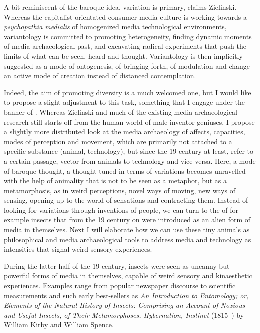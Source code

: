 {A bit reminiscent of the baroque idea, variation is primary, claims
Zielinski. Whereas the capitalist orientated consumer media culture is
working towards a {\em psychopathia medialis} of homogenized media
technological environments, variantology is committed to promoting
heterogeneity, finding dynamic moments of media archaeological past,
and excavating radical experiments that push the limits of what can be
seen, heard and thought. Variantology is then implicitly suggested as a
mode of ontogenesis, of bringing forth, of modulation and change {--}
an active mode of creation instead of distanced contemplation.

Indeed, the aim of promoting diversity is a much welcomed one, but I
would like to propose a slight adjustment to this task, something that
I engage under the banner of . Whereas Zielinski and much
of the existing media archaeological research still starts off from the
human world of male inventor{}-geniuses, I propose a slightly more
distributed look at the media archaeology of affects, capacities, modes
of perception and movement, which are primarily not attached to a
specific substance (animal, technology), but since the 19 century at
least, refer to a certain passage, vector from animals to technology
and vice versa. Here, a mode of baroque thought, a thought tuned in
terms of variations becomes unravelled with the help of animality that
is not to be seen as a metaphor, but as a metamorphosis, as 
in weird perceptions, novel ways of moving, new ways of sensing,
opening up to the world of sensations and contracting them. Instead of
looking for variations through inventions of people, we can turn to the
 of for example insects that from the
19 century on were introduced as an alien form of
media in themselves. Next I will elaborate how we can use these tiny
animals as philosophical and media archaeological tools to address
media and technology as intensities that signal weird sensory
experiences.


During the latter half of the 19 century, insects
were seen as uncanny but powerful forms of media in themselves, capable
of weird sensory and kinaesthetic experiences. Examples range from
popular newspaper discourse to scientific measurements and such early
best{}-sellers as {\em An Introduction to Entomology; or,
Elements of the Natural History of Insects: Comprising an Account of
Noxious and Useful Insects, of Their Metamorphoses, Hybernation,
Instinct} (1815{--}) by William Kirby and William
Spence.

}
